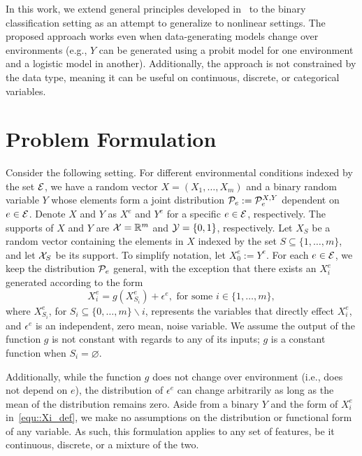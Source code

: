 \documentclass[conference,letterpaper]{IEEEtran}
\begin{document}
In this work, we extend general principles developed in~\cite{du2023learning,du2023generalized} to the binary classification setting as an attempt to generalize to nonlinear settings. The proposed approach works even when data-generating models change over environments (e.g., $Y$ can be generated using a probit model for one environment and a logistic model in another). Additionally, the approach is not constrained by the data type, meaning it can be useful on continuous, discrete, or categorical variables. 

\section{Problem Formulation}\label{sec::formulation}
Consider the following setting. For different environmental conditions indexed by the set $\mathcal{E}$, we have a random vector $X=(X_1,\dots, X_m)$ and a binary random variable $Y$ whose elements form a joint distribution $\mathcal{P}_e := \mathcal{P}_e^{X,Y}$ dependent on $e\in\mathcal{E}$. Denote $X$ and $Y$ as $X^e$ and $Y^e$ for a specific $e\in\mathcal{E}$, respectively. The supports of $X$ and $Y$ are $\mathcal{X}=\mathbb{R}^m$ and $\mathcal{Y}=\{0,1\}$, respectively. Let $X_{S}$ be a random vector containing the elements in $X$ indexed by the set $S\subseteq\{1,\dots,m\}$, and let $\mathcal{X}_S$ be its support. To simplify notation, let $X_0^e:=Y^e$. For each $e\in\mathcal{E}$, we keep the distribution $\mathcal{P}_e$ general, with the exception that there exists an $X^e_i$ generated according to the form 
\begin{equation}\label{equ::Xi_def}
   X^e_i = g(X^e_{S_i}) + \epsilon^e, \text{ for some }i\in\{1,\dots,m\}, 
\end{equation}
where $X^e_{S_i}$, for $S_i\subseteq\{0,\dots,m\}\backslash i$, represents the variables that directly effect $X^e_i$,  and $\epsilon^e$ is an independent, zero mean, noise variable. We assume the output of the function $g$ is not constant with regards to any of its inputs; $g$ is a constant function when $S_i= \varnothing$.  

Additionally, while the function $g$ does not change over environment (i.e., does not depend on $e$), the distribution of $\epsilon^e$ can change arbitrarily as long as the mean of the distribution remains zero. Aside from a binary $Y$ and the form of $X_i^e$ in~\eqref{equ::Xi_def}, we make no assumptions on the distribution or functional form of any variable. As such, this formulation applies to any set of features, be it continuous, discrete, or a mixture of the two. 
\end{document}
